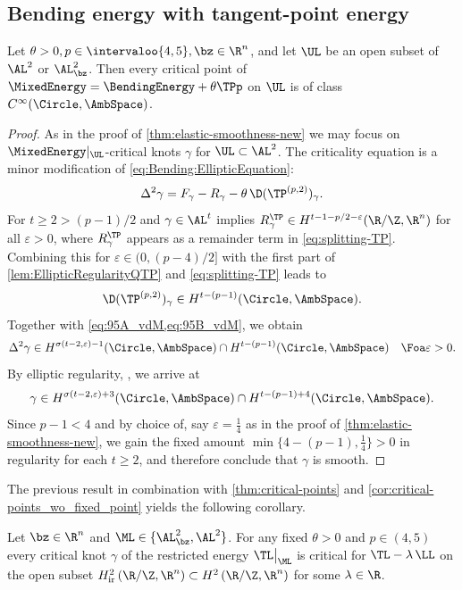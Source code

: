 \subsection{Bending energy with tangent-point energy}\label{sec:RegularityMixed}


\begin{theorem}\label{thm:smoothness-T-critical-new}
Let $\theta>0,p \in \intervaloo{4,5},\bz\in\R^n$, and let $\UL$ be an open subset of $\AL^2$ or $\AL^2_\bz$.
Then every critical point of $\MixedEnergy=\BendingEnergy+\theta\TPp$ on $\UL$ is of class $C^\infty(\Circle,\AmbSpace)$.
\end{theorem}
\begin{proof}As in the proof of \cref{thm:elastic-smoothness-new} we may focus on $ \MixedEnergy\vert_{\UL} $-critical knots $ \gamma $ for $ \UL\subset\AL^{2} $. 
    The criticality equation is a minor modification of \cref{eq:Bending:EllipticEquation}:
    \begin{equation}
        \Delta^2 \gamma = F_\gamma - R_\gamma - \theta \, \D(\TP^{(p,2)})_\gamma.
        \label{eq:Mixed:EllipticEquation}
    \end{equation}
    For $ t\ge 2>{(p-1)}/{2} $ and $ \gamma\in \AL^{t} $ \cite[Proposition 4.3]{blatt-reiter_2015a} implies $ R^{\TP}_{\gamma}\in H^{t-1-p/2-\varepsilon}(\R/\Z,\R^n) $ for all $ \varepsilon>0 $, where $ R^{\TP}_{\gamma} $ appears as a remainder term in \cref{eq:splitting-TP}.
    Combining this for $ \varepsilon\in(0,(p-4)/2] $ with the first part of \cref{lem:EllipticRegularityQTP} and \cref{eq:splitting-TP} leads to    
    \[
        \D(\TP^{(p,2)})_\gamma  \in H^{t-(p-1)}(\Circle,\AmbSpace).
    \]
    Together with \cref{eq:95A_vdM,eq:95B_vdM}, we obtain
    \[
        \Delta^2 \gamma \in H^{\sigma(t-2,\varepsilon)-1}(\Circle,\AmbSpace) \cap H^{t-(p-1)}(\Circle,\AmbSpace)
        \quad\Foa\varepsilon>0.
    \]
    By elliptic regularity, \cite[Theorem 6.33]{folland_1995}, we arrive at
    \[
        \gamma 
        \in
        H^{\sigma(t-2,\varepsilon)+3}(\Circle,\AmbSpace) \cap H^{t-(p-1)+4}(\Circle,\AmbSpace).
    \]
    Since $p-1 < 4$ and by choice of, say $ \varepsilon=\frac{1}{4} $ as in the proof of \cref{thm:elastic-smoothness-new},
    we gain the fixed amount $ \min\{4-(p-1),\frac{1}{4}\} >0$ in regularity for each $ t\ge2 $, and therefore conclude that $ \gamma $ is smooth.
\end{proof}

The previous result in combination with \cref{thm:critical-points} and \cref{cor:critical-points_wo_fixed_point} yields the following corollary.  
\begin{corollary}
    Let $ \bz\in \R^n $ and $ \ML\in\{\AL^2_\bz,\AL^2\} $.
    For any fixed $ \theta>0$ and $p\in(4,5) $ every critical knot $ \gamma $ of the restricted energy $ \TL\big\vert_{\ML} $ is critical for $ \TL-\lambda \, \LL $ on the open subset $ H^2_{\mathrm{ir}}\left( \R/\Z,\R^n \right)\subset H^2\left( \R/\Z,\R^n \right)$ for some $ \lambda\in \R $.     
\end{corollary}


